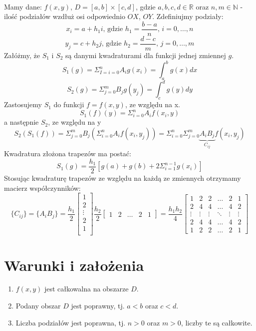 \documentclass{article}
\begin{document}
\paragraph{}
Mamy dane: $f(x,y)$, $D = [a,b]\times[c,d]$, gdzie $a,b,c,d\in\mathbb{R}$ oraz $n,m\in\mathbb{N}$ - ilość podziałów wzdłuż osi odpowiednio $OX$, $OY$. Zdefiniujmy podziały:
$$x_i=a+h_1i\text{, gdzie }h_1=\dfrac{b-a}{n}\text{, }i=0,\dots,n$$
$$y_j=c+h_2j\text{, gdzie }h_2=\dfrac{d-c}{m}\text{, }j=0,\dots,m$$
Załóżmy, że $S_1$ i $S_2$ są danymi kwadraturami dla funkcji jednej zmiennej $g$.\\
$$S_1(g) = \Sigma_{I=i=0}^{n}A_ig(x_i)=\int_a^bg(x)dx$$
$$S_2(g) = \Sigma_{j=0}^{m}B_jg(y_j)=\int_c^dg(y)dy$$
Zastosujemy $S_1$ do funkcji $f=f(x,y)$, ze względu na x.
$$S_1(f)(y)=\Sigma_{i=0}^nA_if(x_i,y)$$
a następnie $S_2$, ze względu na y
$$S_2(S_1(f))=\Sigma_{j=0}^mB_j(\Sigma_{i=0}^nA_if(x_i,y_j))=\Sigma_{i=0}^n\Sigma_{j=0}^m\underbrace{A_iB_j}_{C_{ij}}f(x_i,y_j)$$
Kwadratura złożona trapezów ma postać:
$$S_1(g)=\frac{h_1}{2}[g(a)+g(b)+2\Sigma_{i=1}^{n-1}g(x_i)]$$
Stosując kwadraturę trapezów ze względu na każdą ze zmiennych otrzymamy macierz współczynników:
$$\{C_{ij}\}=\{A_iB_j\}=\frac{h_1}{2}
\begin{bmatrix}
1\\
2\\
\vdots\\
2\\
1\\
\end{bmatrix}
\frac{h_2}{2}
\begin{bmatrix}
1 & 2 & \dots & 2 & 1
\end{bmatrix}=\frac{h_1h_2}{4}
\begin{bmatrix}
1 & 2 & 2 & \dots & 2 & 1\\
2 & 4 & 4 & \dots & 4 & 2\\
\vdots & \vdots & \vdots & \ddots & \vdots & \vdots\\
2 & 4 & 4 & \dots & 4 & 2\\
1 & 2 & 2 & \dots & 2 & 1
\end{bmatrix}$$
\section{Warunki i założenia}
\begin{enumerate}
\item $f(x,y)$ jest całkowalna na obszarze $D$.
\item Podany obszar $D$ jest poprawny, tj. $a<b$ oraz $c<d$.
\item Liczba podziałów jest poprawna, tj. $n >0$ oraz $m > 0$, liczby te są całkowite.
\end{enumerate}
\end{document}
